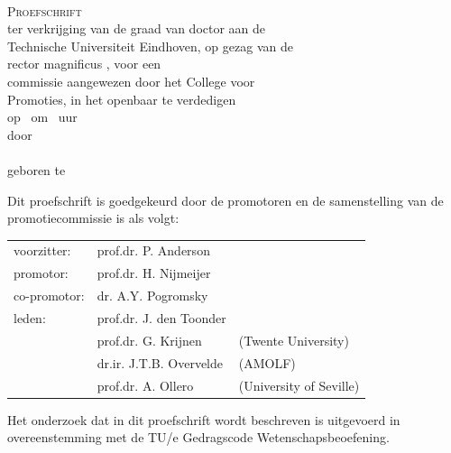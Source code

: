 \newpage
\thispagestyle{empty}



\vspace*{30mm}
\begin{center}
{\LARGE\sf\maintitle}\\[30mm] %
{\large\textsc{Proefschrift}}\\[8mm]
ter verkrijging van de graad van doctor aan de\\
Technische Universiteit Eindhoven, op gezag van de\\
rector magnificus \rector, voor een\\
commissie aangewezen door het College voor\\
Promoties, in het openbaar te verdedigen\\
op \ om \ uur\\[8mm]
door\\[8mm]
\@author\\[8mm]
geboren te \placeofbirth
\end{center}
\vfill

\newpage
\thispagestyle{empty}

\noindent
Dit proefschrift is goedgekeurd door de promotoren en de samenstelling van de promotiecommissie is als volgt:\\[7mm]

\noindent
\begin{tabular}{@{}l p{3.8cm} p{3.8cm}}
voorzitter:                 &   prof.dr. P. Anderson \\
promotor:                   &   prof.dr. H. Nijmeijer \\
co-promotor:                &   dr. A.Y. Pogromsky \\
leden:                      &   prof.dr. J. den Toonder \\
                            &   prof.dr. G. Krijnen & (Twente University) \\
                            &   dr.ir. J.T.B. Overvelde &  (AMOLF) \\
                            &   prof.dr. A. Ollero  &  (University of Seville) \\
\end{tabular}

\vfill
\noindent
Het onderzoek dat in dit proefschrift wordt beschreven is uitgevoerd in overeenstemming met de TU/e Gedragscode Wetenschapsbeoefening.
